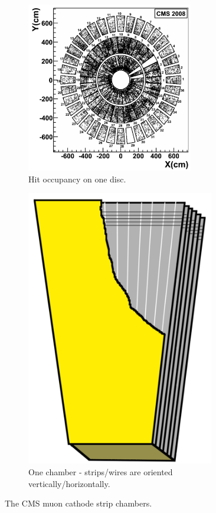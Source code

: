 \begin{figure}[hb!]
\centering
\begin{subfigure}[b]{0.55\textwidth}
\includegraphics[width=0.8\textwidth]{figs/cscring.png}
\caption{Hit occupancy on one disc.}
\label{fig:cscring}
\end{subfigure}
\begin{subfigure}[b]{0.3\textwidth}
\includegraphics[width=0.9\textwidth]{figs/cscchamber.png}
\caption{One chamber - strips/wires are oriented vertically/horizontally.}
\label{fig:cscchamber}
\end{subfigure}
\caption{The CMS muon cathode strip chambers.}
\end{figure}

